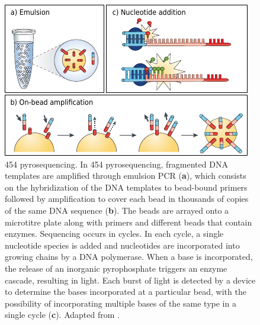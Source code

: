 \begin{figure}[h!]
    \centering
    \includegraphics[angle=0,width=\textwidth]{figures/introduction/Figure4.pdf}
    \caption[454 pyrosequencing]{454 pyrosequencing. In 454 pyrosequencing, fragmented DNA templates are amplified through emulsion \ac{PCR} (\textbf{a}), which consists on the hybridization of the DNA templates to bead-bound primers followed by amplification to cover each bead in thousands of copies of the same DNA sequence (\textbf{b}). The beads are arrayed onto a microtitre plate along with primers and different beads that contain enzymes. Sequencing occurs in cycles. In each cycle, a single nucleotide species is added and nucleotides are incorporated into growing chains by a DNA polymerase. When a base is incorporated, the release of an inorganic pyrophosphate triggers an enzyme cascade, resulting in light. Each burst of light is detected by a device to determine the bases incorporated at a particular bead, with the possibility of incorporating multiple bases of the same type in a single cycle (\textbf{c}). Adapted from \cite{loman_twenty_2015, goodwin_coming_2016}.}
    \label{fig:introduction_figure4}
\end{figure}


